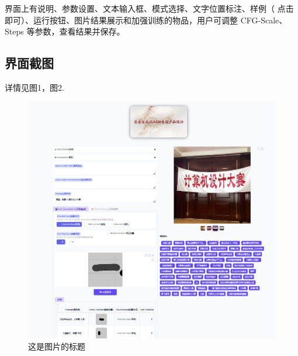 \documentclass[a4paper,12pt]{article}
\begin{document}
界面上有说明、参数设置、文本输入框、模式选择、文字位置标注、样例（
点击即可）、运行按钮、图片结果展示和加强训练的物品，用户可调整 CFG-Scale、Steps 等参数，查看结果并保存。
\subsection{界面截图}
详情见图1，图2.
\begin{figure}[htbp] %
    \centering %
    \includegraphics[width=1\textwidth]{Image/UI_1.png} %
    \caption{这是图片的标题} %
    \label{fig:logo} %
\end{figure}
\end{document}
